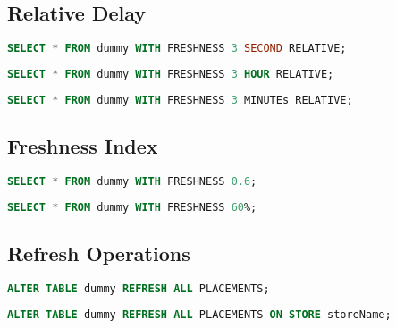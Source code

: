 \tocless\subsection{Relative Delay}

\begin{lstlisting}[language=sql]
    SELECT * FROM dummy WITH FRESHNESS 3 SECOND RELATIVE;
\end{lstlisting}

\begin{lstlisting}[language=sql]
    SELECT * FROM dummy WITH FRESHNESS 3 HOUR RELATIVE;
\end{lstlisting}

\begin{lstlisting}[language=sql]
    SELECT * FROM dummy WITH FRESHNESS 3 MINUTEs RELATIVE;
\end{lstlisting}



\tocless\subsection{Freshness Index}

\begin{lstlisting}[language=sql]
    SELECT * FROM dummy WITH FRESHNESS 0.6;
\end{lstlisting}

\begin{lstlisting}[language=sql]
    SELECT * FROM dummy WITH FRESHNESS 60%;
\end{lstlisting}



\tocless\subsection{Refresh Operations}

\begin{lstlisting}[language=sql]
    ALTER TABLE dummy REFRESH ALL PLACEMENTS;
\end{lstlisting}

\begin{lstlisting}[language=sql]
    ALTER TABLE dummy REFRESH ALL PLACEMENTS ON STORE storeName;
\end{lstlisting}
